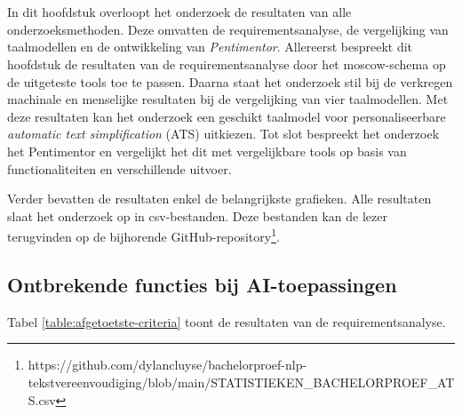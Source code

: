 \chapter{}%
\label{ch:resultaten}

In dit hoofdstuk overloopt het onderzoek de resultaten van alle onderzoeksmethoden. Deze omvatten de requirementsanalyse, de vergelijking van taalmodellen en de ontwikkeling van \textit{Pentimentor}. Allereerst bespreekt dit hoofdstuk de resultaten van de requirementsanalyse door het moscow-schema op de uitgeteste tools toe te passen. Daarna staat het onderzoek stil bij de verkregen machinale en menselijke resultaten bij de vergelijking van vier taalmodellen. Met deze resultaten kan het onderzoek een geschikt taalmodel voor personaliseerbare \textit{automatic text simplification} (ATS) uitkiezen. Tot slot bespreekt het onderzoek het Pentimentor en vergelijkt het dit met vergelijkbare tools op basis van functionaliteiten en verschillende uitvoer. 

\medspace

Verder bevatten de resultaten enkel de belangrijkste grafieken. Alle resultaten slaat het onderzoek op in csv-bestanden. Deze bestanden kan de lezer terugvinden op de bijhorende GitHub-repository\footnote{https://github.com/dylancluyse/bachelorproef-nlp-tekstvereenvoudiging/blob/main/STATISTIEKEN\_BACHELORPROEF\_ATS.csv}.

\section{Ontbrekende functies bij AI-toepassingen}

Tabel \ref{table:afgetoetste-criteria} toont de resultaten van de requirementsanalyse.

